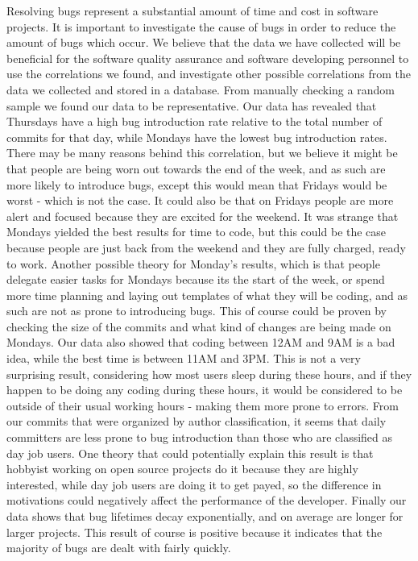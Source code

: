 {Resolving bugs represent a substantial amount of time and cost in
software projects. It is important to investigate the cause of bugs in
order to reduce the amount of bugs which occur. We believe that the
data we have collected will be beneficial for the software quality
assurance and software developing personnel to use the correlations we
found, and investigate other possible correlations from the data we
collected and stored in a database. From manually checking a random
sample we found our data to be representative. Our data has
revealed that Thursdays have a high bug introduction rate relative to
the total number of commits for that day, while Mondays have the
lowest bug introduction rates. There may be many reasons behind this
correlation, but we believe it might be that people are being worn out towards the
end of the week, and as such are more likely to introduce bugs, except
this would mean that Fridays would be worst - which is not the
case. It could also be that on Fridays people are more alert and focused
because they are excited for the weekend. It was strange that Mondays
yielded the best results for time to code, but this could be the case
because people are just back from the weekend and they are fully
charged, ready to work. Another possible theory for Monday's results,
which is that people delegate easier tasks for Mondays because its the
start of the week, or spend more time planning and laying out
templates of what they will be coding, and as such are not as prone to
introducing bugs. This of course could be proven by checking the size of
the commits and what kind of changes are being made on Mondays. Our
data also showed that coding between 12AM and 9AM is a bad idea, while
the best time is between 11AM and 3PM. This is not a very surprising
result, considering how most users sleep during these hours, and if
they happen to be doing any coding during these hours, it would be
considered to be outside of their usual working hours - making them
more prone to errors.  From our commits that were organized by author
classification, it seems that daily committers are less prone to bug
introduction than those who are classified as day job users. One
theory that could potentially explain this result is that hobbyist
working on open source projects do it because they are highly
interested, while day job users are doing it to get payed, so the
difference in motivations could negatively affect the performance
of the developer. Finally our data shows that bug lifetimes decay
exponentially, and on average are longer for larger projects. This
result of course is positive because it indicates that the majority of
bugs are dealt with fairly quickly.
}
